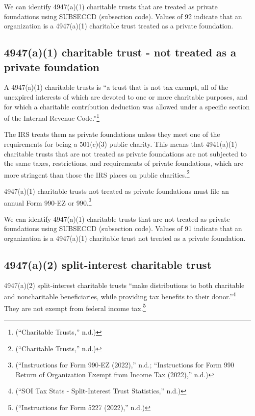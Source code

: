 \documentclass[
  letterpaper,
  DIV=11,
  numbers=noendperiod,
  oneside]{scrreprt}
\begin{document}
We can identify 4947(a)(1) charitable trusts that are treated as private
foundations using SUBSECCD (subsection code). Values of 92 indicate that
an organization is a 4947(a)(1) charitable trust treated as a private
foundation.

\hypertarget{a1-charitable-trust---not-treated-as-a-private-foundation}{%
\subsection{4947(a)(1) charitable trust - not treated as a private
foundation}\label{a1-charitable-trust---not-treated-as-a-private-foundation}}

A 4947(a)(1) charitable trusts is ``a trust that is not tax exempt, all
of the unexpired interests of which are devoted to one or more
charitable purposes, and for which a charitable contribution deduction
was allowed under a specific section of the Internal Revenue
Code.''\footnote{({``Charitable Trusts,''} n.d.)}

The IRS treats them as private foundations unless they meet one of the
requirements for being a 501(c)(3) public charity. This means that
4941(a)(1) charitable trusts that are not treated as private foundations
are not subjected to the same taxes, restrictions, and requirements of
private foundations, which are more stringent than those the IRS places
on public charities.\footnote{({``Charitable Trusts,''} n.d.)}

4947(a)(1) charitable trusts not treated as private foundations must
file an annual Form 990-EZ or 990.\footnote{({``Instructions for Form
  990-EZ (2022),''} n.d.; {``Instructions for Form 990 Return of
  Organization Exempt from Income Tax (2022),''} n.d.)}

We can identify 4947(a)(1) charitable trusts that are not treated as
private foundations using SUBSECCD (subsection code). Values of 91
indicate that an organization is a 4947(a)(1) charitable trust not
treated as a private foundation.

\hypertarget{a2-split-interest-charitable-trust}{%
\subsection{4947(a)(2) split-interest charitable
trust}\label{a2-split-interest-charitable-trust}}

4947(a)(2) split-interest charitable trusts ``make distributions to both
charitable and noncharitable beneficiaries, while providing tax benefits
to their donor.''\footnote{({``SOI Tax Stats - Split-Interest Trust
  Statistics,''} n.d.)} They are not exempt from federal income
tax.\footnote{({``Instructions for Form 5227 (2022),''} n.d.)}
\end{document}
